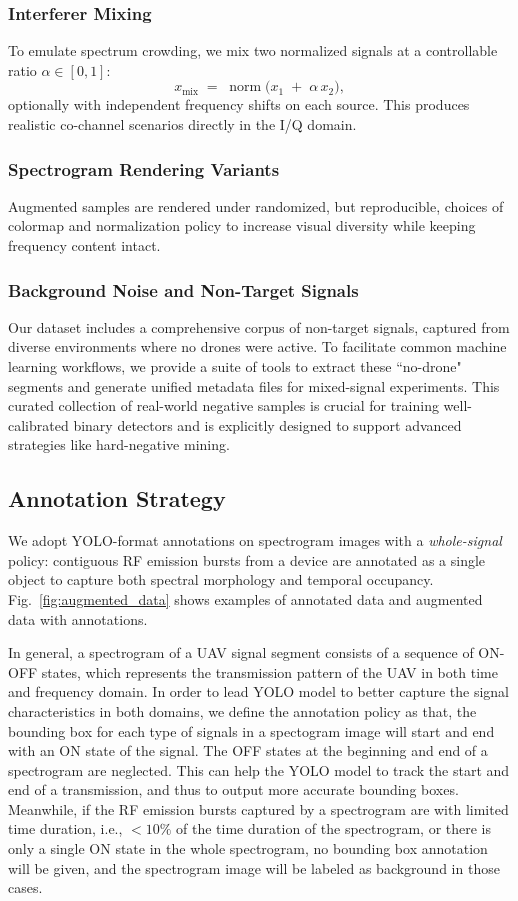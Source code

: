\subsubsection{Interferer Mixing}
To emulate spectrum crowding, we mix two normalized signals at a controllable ratio $\alpha\in[0,1]$:
\[
x_{\text{mix}} \;=\; \operatorname{norm}\big(x_1\;+\;\alpha\, x_2\big),
\]
optionally with independent frequency shifts on each source. This produces realistic co-channel scenarios directly in the I/Q domain.

\subsubsection{Spectrogram Rendering Variants}
Augmented samples are rendered under randomized, but reproducible, choices of colormap and normalization policy to increase visual diversity while keeping frequency content intact.

\subsubsection{Background Noise and Non-Target Signals}
Our dataset includes a comprehensive corpus of non-target signals, captured from diverse environments where no drones were active. To facilitate common machine learning workflows, we provide a suite of tools to extract these ``no-drone" segments and generate unified metadata files for mixed-signal experiments. This curated collection of real-world negative samples is crucial for training well-calibrated binary detectors and is explicitly designed to support advanced strategies like hard-negative mining.

\subsection{Annotation Strategy}
We adopt YOLO-format annotations on spectrogram images with a \emph{whole-signal} policy: contiguous RF emission bursts from a device are annotated as a single object to capture both spectral morphology and temporal occupancy. Fig.~\ref{fig:augmented_data} shows examples of annotated data and augmented data with annotations.

In general, a spectrogram of a UAV signal segment consists of a sequence of ON-OFF states, which represents the transmission pattern of the UAV in both time and frequency domain. In order to lead YOLO model to better capture the signal characteristics in both domains, we define the annotation policy as that, the bounding box for each type of signals in a spectogram image will start and end with an ON state of the signal. The OFF states at the beginning and end of a spectrogram are neglected. This can help the YOLO model to track the start and end of a transmission, and thus to output more accurate bounding boxes. Meanwhile, if the RF emission bursts captured by a spectrogram are with limited time duration, i.e., $<10\%$ of the time duration of the spectrogram, or there is only a single ON state in the whole spectrogram, no bounding box annotation will be given, and the spectrogram image will be labeled as background in those cases. 

